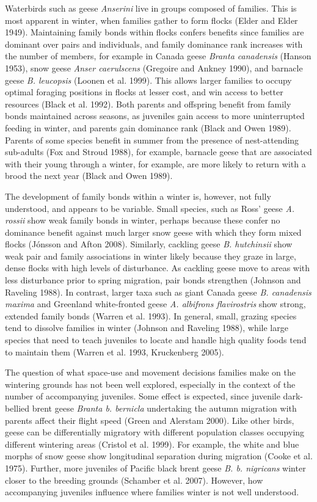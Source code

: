 \documentclass[10pt,twocolumn]{paper}
\begin{document}
Waterbirds such as geese \emph{Anserini} live in groups composed of
families. This is most apparent in winter, when families gather to form
flocks (Elder and Elder 1949). Maintaining family bonds within flocks
confers benefits since families are dominant over pairs and individuals,
and family dominance rank increases with the number of members, for
example in Canada geese \emph{Branta canadensis} (Hanson 1953), snow
geese \emph{Anser caerulscens} (Gregoire and Ankney 1990), and barnacle
geese \emph{B. leucopsis} (Loonen et al. 1999). This allows larger
families to occupy optimal foraging positions in flocks at lesser cost,
and win access to better resources (Black et al. 1992). Both parents and
offspring benefit from family bonds maintained across seasons, as
juveniles gain access to more uninterrupted feeding in winter, and
parents gain dominance rank (Black and Owen 1989). Parents of some
species benefit in summer from the presence of nest-attending sub-adults
(Fox and Stroud 1988), for example, barnacle geese that are associated
with their young through a winter, for example, are more likely to
return with a brood the next year (Black and Owen 1989).

The development of family bonds within a winter is, however, not fully
understood, and appears to be variable. Small species, such as Ross'
geese \emph{A. rossii} show weak family bonds in winter, perhaps because
these confer no dominance benefit against much larger snow geese with
which they form mixed flocks (Jónsson and Afton 2008). Similarly,
cackling geese \emph{B. hutchinsii} show weak pair and family
associations in winter likely because they graze in large, dense flocks
with high levels of disturbance. As cackling geese move to areas with
less disturbance prior to spring migration, pair bonds strengthen
(Johnson and Raveling 1988). In contrast, larger taxa such as giant
Canada geese \emph{B. canadensis maxima} and Greenland white-fronted
geese \emph{A. albifrons flavirostris} show strong, extended family
bonds (Warren et al. 1993). In general, small, grazing species tend to
dissolve families in winter (Johnson and Raveling 1988), while large
species that need to teach juveniles to locate and handle high quality
foods tend to maintain them (Warren et al. 1993, Kruckenberg 2005).

The question of what space-use and movement decisions families make on
the wintering grounds has not been well explored, especially in the
context of the number of accompanying juveniles. Some effect is
expected, since juvenile dark-bellied brent geese \emph{Branta b.
bernicla} undertaking the autumn migration with parents affect their
flight speed (Green and Alerstam 2000). Like other birds, geese can be
differentially migratory with different population classes occupying
different wintering areas (Cristol et al. 1999). For example, the white
and blue morphs of snow geese show longitudinal separation during
migration (Cooke et al. 1975). Further, more juveniles of Pacific black
brent geese \emph{B. b. nigricans} winter closer to the breeding grounds
(Schamber et al. 2007). However, how accompanying juveniles influence
where families winter is not well understood.
\end{document}
